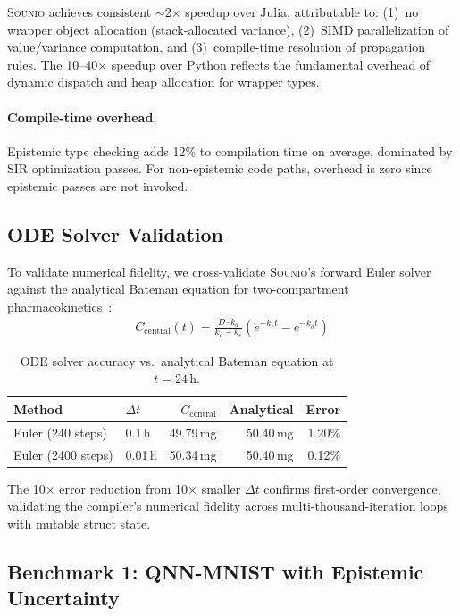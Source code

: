 \documentclass[acmsmall,screen,review,anonymous]{acmart}
\newcommand{\sounio}{\textsc{Sounio}\xspace}
\begin{document}
\sounio achieves consistent $\sim$2$\times$ speedup over Julia, attributable
to: (1)~no wrapper object allocation (stack-allocated variance),
(2)~SIMD parallelization of value/variance computation, and
(3)~compile-time resolution of propagation rules.
The 10--40$\times$ speedup over Python reflects the fundamental
overhead of dynamic dispatch and heap allocation for wrapper types.

\paragraph{Compile-time overhead.}
Epistemic type checking adds 12\% to compilation time on average,
dominated by SIR optimization passes.
For non-epistemic code paths, overhead is zero since
epistemic passes are not invoked.



\subsection{ODE Solver Validation}
\label{sec:ode-validation}

To validate numerical fidelity, we cross-validate \sounio's forward Euler
solver against the analytical Bateman equation for two-compartment
pharmacokinetics~\cite{gibaldi1982pharmacokinetics}:
\begin{align}
  C_{\text{central}}(t) = \frac{D \cdot k_a}{k_a - k_e}
    \left(e^{-k_e t} - e^{-k_a t}\right)
\end{align}

\begin{table}[t]
\centering
\caption{ODE solver accuracy vs.\ analytical Bateman equation at $t = 24$\,h.}
\label{tab:ode}
\begin{tabular}{llrrr}
\toprule
Method & $\Delta t$ & $C_{\text{central}}$ & Analytical & Error \\
\midrule
Euler (240 steps)  & 0.1\,h  & 49.79\,mg & 50.40\,mg & 1.20\% \\
Euler (2400 steps) & 0.01\,h & 50.34\,mg & 50.40\,mg & 0.12\% \\
\bottomrule
\end{tabular}
\end{table}

The 10$\times$ error reduction from 10$\times$ smaller $\Delta t$
confirms first-order convergence, validating the compiler's numerical
fidelity across multi-thousand-iteration loops with mutable struct state.

\subsection{Benchmark 1: QNN-MNIST with Epistemic Uncertainty}
\end{document}
